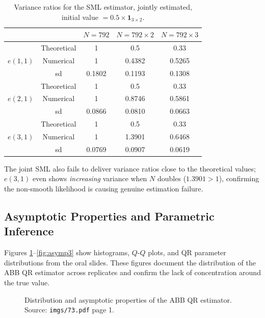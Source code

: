 \documentclass[12pt]{article}
\begin{document}
\begin{table}[H]
\centering
\caption{Variance ratios for the SML estimator, jointly estimated,
initial value $=0.5\times\mathbf{1}_{3\times2}$.}
\label{tab:mle_var_joint}
\begin{tabular}{lcccc}
\toprule
 & & $N=792$ & $N=792\times2$ & $N=792\times3$ \\
\midrule
\multirow{3}{*}{$e(1,1)$}
 & Theoretical & \textcolor{myred}{1} & \textcolor{myred}{0.5} & \textcolor{myred}{0.33} \\
 & Numerical   & 1 & 0.4382 & 0.5265 \\
 & sd          & 0.1802 & 0.1193 & 0.1308 \\
\midrule
\multirow{3}{*}{$e(2,1)$}
 & Theoretical & \textcolor{myred}{1} & \textcolor{myred}{0.5} & \textcolor{myred}{0.33} \\
 & Numerical   & 1 & 0.8746 & 0.5861 \\
 & sd          & 0.0866 & 0.0810 & 0.0663 \\
\midrule
\multirow{3}{*}{$e(3,1)$}
 & Theoretical & \textcolor{myred}{1} & \textcolor{myred}{0.5} & \textcolor{myred}{0.33} \\
 & Numerical   & 1 & 1.3901 & 0.6468 \\
 & sd          & 0.0769 & 0.0907 & 0.0619 \\
\bottomrule
\end{tabular}
\end{table}

\noindent
The joint SML also fails to deliver variance ratios close to the theoretical
values; $e(3,1)$ even shows \emph{increasing} variance when $N$ doubles
($1.3901 > 1$), confirming the non-smooth likelihood is causing genuine
estimation failure.

\subsection{Asymptotic Properties and Parametric Inference}

Figures \ref{fig:asymp1}--\ref{fig:asymp3} show histograms, $Q$-$Q$ plots,
and QR parameter distributions from the oral slides.
These figures document the distribution of the ABB QR estimator across
replicates and confirm the lack of concentration around the true value.

\begin{figure}[H]
\centering
\caption{Distribution and asymptotic properties of the ABB QR estimator.
Source: \texttt{imgs/73.pdf} page 1.}
\label{fig:asymp1}
\end{figure}
\end{document}
